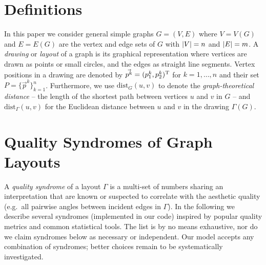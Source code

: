 
%

\section{Definitions}
\label{sec:definitions}

In this paper we consider general simple graphs $G=(V,E)$ where $V=V(G)$ and $E=E(G)$ are the vertex and edge sets of
$G$ with $\left\lvert V\right\rvert=n$ and $\left\lvert E\right\rvert=m$.  A \emph{drawing} or \emph{layout} of a graph is its graphical representation
where vertices are drawn as points or small circles, and the edges as straight line segments.  Vertex positions in a
drawing are denoted by $\vec{p^k}=(p_1^k, p_2^k)^\mathrm{T}$ for $k=1,\dots,n$ and their set $P=\{\vec{p}^k\}_{k=1}^n$.
Furthermore, we use $\textrm{dist}_G(u,v)$ to denote the \emph{graph-theoretical distance} -- the length of the shortest
path between vertices $u$ and $v$ in $G$ -- and $\textrm{dist}_\Gamma(u,v)$ for the Euclidean distance between $u$ and
$v$ in the drawing $\Gamma(G)$.

\section{Quality Syndromes of Graph Layouts}
\label{sec:syndromes}

A \emph{quality syndrome} of a layout $\Gamma$ is a multi-set of numbers sharing an interpretation that are known or
suspected to correlate with the aesthetic quality (e.g.~all pairwise angles between incident edges in $\Gamma$).  In the
following we describe several syndromes (implemented in our code) inspired by popular quality metrics and common
statistical tools.  The list is by no means exhaustive, nor do we claim syndromes below as necessary or independent.
Our model accepts any combination of syndromes; better choices remain to be systematically investigated.

